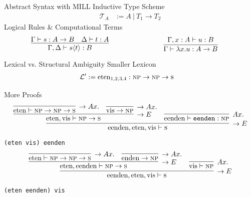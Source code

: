 \documentclass{beamer}
\newlength{\arrow}
\begin{document}
\begin{frame}{Abstract Syntax with MILL}
    \alert{Inductive Type Scheme} \\
    \begin{align*}
        \mathcal{T}_A &:= A \ | \ T_1 \to T_2
    \end{align*}
    \alert{Logical Rules \& Computational Terms}
    \begin{align*}
    \begin{minipage}{0.5\textwidth}
		\[
	        \infer{\Gamma, \Delta \vdash s\langle t \rangle: B}{
	            \Gamma \vdash s: A \rightarrow B
	            &
	            \Delta \vdash t: A
	        }
	    \]
	    \end{minipage}    \begin{minipage}{0.5\textwidth}
	    \[
	        \infer{\Gamma \vdash \lambda x.u : A \rightarrow B}{
	            \Gamma, x: A \vdash u: B
	        }
	    \]
    	\end{minipage}
    \end{align*}
\end{frame}

\begin{frame}{Lexical vs. Structural Ambiguity}
    \alert{Smaller Lexicon}
    \begin{align*}
    \mathcal{L}' := \text{eten}_{1,2,3,4} &: \textsc{np} \to \textsc{np} \to \textsc{s} 
    \end{align*}

\pause
    \alert{More Proofs}
    \footnotesize 
    \vfill
    \[
    \infer[\rightarrow E]{\text{eenden}, \text{eten}, \text{vis} \vdash \textsc{s}}{
    	\infer[\rightarrow E]{\text{eten}, \text{vis} \vdash \textsc{np} \to \textsc{s}}{
    		\infer[\rightarrow Ax.]{\text{eten} \vdash \textsc{np} \to \textsc{np} \to \textsc{s}}{}
    		&
    		\infer[\rightarrow Ax.]{\text{vis} \to \textsc{np}}{}
    		}
    	&
    	\infer[Ax.]{\text{eenden} \vdash \texttt{eenden}: \textsc{np}}{}			
    }
    \]	
    \center \texttt{(eten vis) eenden} {\large\color{blue}\checkmark}
    \vfill
    \[
    \infer[\rightarrow E]{\text{eenden}, \text{eten}, \text{vis} \vdash \textsc{s}}{
    \infer[\rightarrow E]{\text{eten}, \text{eenden} \vdash \textsc{np} \to \textsc{s}}{
    	\infer[\rightarrow Ax.]{\text{eten} \vdash \textsc{np} \to \textsc{np} \to \textsc{s}}{}
    	&
    	\infer[\rightarrow Ax.]{\text{enden} \to \textsc{np}}{}
    	}
    &
    \infer[Ax.]{\text{vis} \vdash \textsc{np}}{}			
    }
    \]
    \center \texttt{(eten eenden) vis} {\large\color{red}}
\end{frame}
\end{document}
